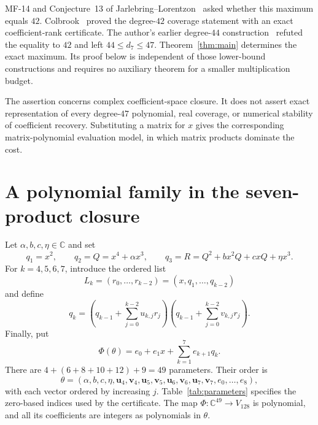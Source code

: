 \documentclass[11pt]{article}
\newcommand{\C}{\mathbb C}
\begin{document}
MF-14 and Conjecture~13 of Jarlebring--Lorentzon~\cite{JL} asked whether
this maximum equals $42$. Colbrook~\cite{Colbrook} proved the degree-$42$
coverage statement with an exact coefficient-rank certificate. The
author's earlier degree-$44$ construction~\cite{Webb44} refuted the
equality to $42$ and left $44\le d_7\le47$. Theorem~\ref{thm:main}
determines the exact maximum. Its proof below is independent of those
lower-bound constructions and requires no auxiliary theorem for a
smaller multiplication budget.

The assertion concerns complex coefficient-space closure. It does not
assert exact representation of every degree-$47$ polynomial, real
coverage, or numerical stability of coefficient recovery. Substituting
a matrix for $x$ gives the corresponding matrix-polynomial evaluation
model, in which matrix products dominate the cost.

\section{A polynomial family in the seven-product closure}\label{sec:family}

Let $\alpha,b,c,\eta\in\C$ and set
\begin{equation}\label{eq:first-three}
 q_1=x^2,\qquad q_2=Q=x^4+\alpha x^3,\qquad
 q_3=R=Q^2+b x^2Q+c xQ+\eta x^3.
\end{equation}
For $k=4,5,6,7$, introduce the ordered list
\[
 L_k=(r_0,\ldots,r_{k-2})=(x,q_1,\ldots,q_{k-2})
\]
and define
\begin{equation}\label{eq:later-products}
 q_k=
 \left(q_{k-1}+\sum_{j=0}^{k-2}u_{k,j}r_j\right)
 \left(q_{k-1}+\sum_{j=0}^{k-2}v_{k,j}r_j\right).
\end{equation}
Finally, put
\begin{equation}\label{eq:output}
 \Phi(\theta)=e_0+e_1x+\sum_{k=1}^{7}e_{k+1}q_k.
\end{equation}
There are $4+(6+8+10+12)+9=49$ parameters. Their order is
\begin{equation}\label{eq:parameter-order}
 \theta=(\alpha,b,c,\eta,
          \mathbf u_4,\mathbf v_4,
          \mathbf u_5,\mathbf v_5,
          \mathbf u_6,\mathbf v_6,
          \mathbf u_7,\mathbf v_7,e_0,\ldots,e_8),
\end{equation}
with each vector ordered by increasing $j$. Table~\ref{tab:parameters}
specifies the zero-based indices used by the certificate. The map
$\Phi:\C^{49}\to V_{128}$ is polynomial, and all its coefficients
are integers as polynomials in $\theta$.
\end{document}
